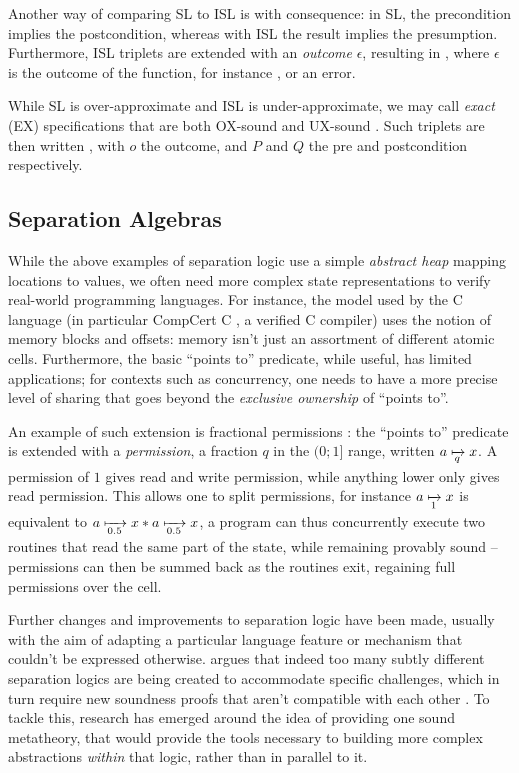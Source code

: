Another way of comparing SL to ISL is with consequence: in SL, the precondition implies the postcondition, whereas with ISL the result implies the presumption. Furthermore, ISL triplets are extended with an \emph{outcome} $\epsilon$, resulting in , where $\epsilon$ is the outcome of the function, for instance \Ok, or an error.

While SL is over-approximate and ISL is under-approximate, we may call \emph{exact} (EX) specifications that are both OX-sound and UX-sound \cite{exactsl}. Such triplets are then written , with $o$ the outcome, and $P$ and $Q$ the pre and postcondition respectively.

\subsection{Separation Algebras}
\label{subsec:separation-algebras}

While the above examples of separation logic use a simple \emph{abstract heap} mapping locations to values, we often need more complex state representations to verify real-world programming languages. For instance, the model used by the C language (in particular CompCert C \cite{compcert}, a verified C compiler) uses the notion of memory blocks and offsets: memory isn't just an assortment of different atomic cells. Furthermore, the basic ``points to'' predicate, while useful, has limited applications; for contexts such as concurrency, one needs to have a more precise level of sharing that goes beyond the \emph{exclusive ownership} of ``points to''.

An example of such extension is fractional permissions \cite{fracpermissions, fracpermissions2}: the ``points to'' predicate is extended with a \emph{permission}, a fraction $q$ in the $(0;1]$ range, written $a \mapstoq{q} x$. A permission of $1$ gives read and write permission, while anything lower only gives read permission. This allows one to split permissions, for instance $a \mapstoq{1} x$ is equivalent to $a\mapstoq{0.5}x * a\mapstoq{0.5}x$, a program can thus concurrently execute two routines that read the same part of the state, while remaining provably sound -- permissions can then be summed back as the routines exit, regaining full permissions over the cell.

Further changes and improvements to separation logic have been made, usually with the aim of adapting a particular language feature or mechanism that couldn't be expressed otherwise.  \cite{next700seplogics} argues that indeed too many subtly different separation logics are being created to accommodate specific challenges, which in turn require new soundness proofs that aren't compatible with each other \cite{sljungle}. To tackle this, research has emerged around the idea of providing one sound metatheory, that would provide the tools necessary to building more complex abstractions \emph{within} that logic, rather than in parallel to it.

